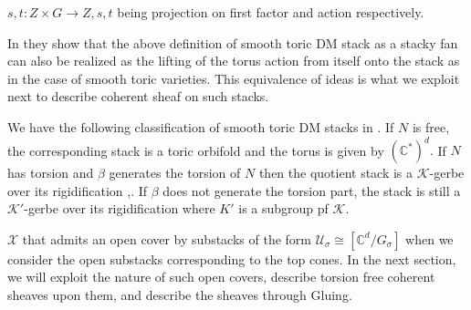 \documentclass[10pt]{amsart}
\newcommand{\sX}{{\mathcal X}}
\numberwithin{equation}{subsection}
\begin{document}
$s,t:Z\times G \to Z,s,t$ being projection on first factor and action respectively.\par 
In \cite{FMN} they show that the above definition of smooth toric DM stack as a stacky fan can also be realized as the lifting of the torus action from itself onto the stack as in the case of smooth toric varieties. This equivalence of ideas is what we exploit next to describe coherent sheaf on such stacks. \par 
We have the following classification of smooth toric DM stacks in \cite{FMN}. If $N$ is free, the corresponding stack is a toric orbifold and the torus is given by $(\mathbb{C^*})^d.$ If $N$ has torsion and $\beta$ generates the torsion of $N$ then the quotient stack is a $\mathscr{K}$-gerbe over its rigidification \cite{JT},\cite{FMN}. If $\beta$ does not generate the torsion part, the stack is still a $\mathscr{K}'$-gerbe over its rigidification where $K'$ is a subgroup pf $\mathscr{K}.$\par 
$\sX$ that admits an open cover by substacks of the form $\mathscr{U}_{\sigma}\cong[\mathbb{C}^d/G_{\sigma}]$ when we consider the open substacks corresponding to the top cones. In the next section, we will exploit the nature of such open covers, describe torsion free coherent sheaves upon them, and describe the sheaves through Gluing.
\end{document}
